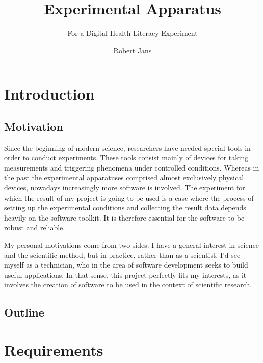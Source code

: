 \documentclass[a4paper]{usiinfbachelorproject}
\author{Robert Jans}
\title{\textbf{Experimental Apparatus}}
\subtitle{For a Digital Health Literacy Experiment}
\begin{document}
\maketitle
\tableofcontents\newpage
\listoffigures\newpage

\section{\textbf{Introduction}}

\subsection{Motivation}

Since the beginning of modern science, researchers have needed special tools in order to conduct experiments. These tools consist 
mainly of devices for taking measurements and triggering phenomena under controlled conditions. Whereas in the past the
experimental apparatuses comprised almost exclusively physical devices, nowadays increasingly more software is involved.
The experiment for which the result of my project is going to be used is a case where the process of 
setting up the experimental conditions and collecting the result data depends heavily on the software toolkit. It is therefore
essential for the software to be robust and reliable.

My personal motivations come from two sides: I have a general interest in science and the scientific method, but in practice,
rather than as a scientist,
I'd see myself as a technician, who in the area of software development seeks to build useful applications.
In that sense, this project perfectly fits my interests, as it involves the creation of software to be used in the context of
scientific research.    

\subsection{Outline}



\section{\textbf{Requirements}} \label{sec:req}
\end{document}
